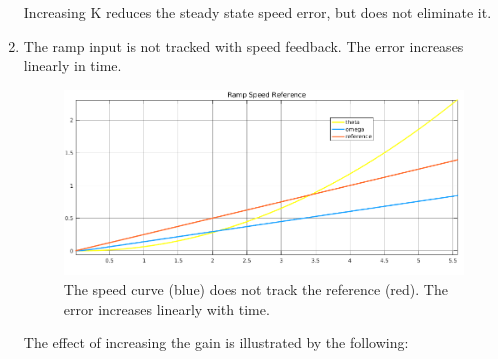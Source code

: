 \documentclass[11pt,a4paper]{article}
\begin{document}
\begin{enumerate}
Increasing K reduces the steady state speed error, but does not eliminate it.
	
	\item The ramp input is not tracked with speed feedback. The error increases linearly in time.
	
	\begin{figure}[!htbp]
	\includegraphics[width=\textwidth]{imglab/lab4sol_rampspeedtraj.png}
	\caption{The speed curve (blue) does not track the reference (red). The error increases linearly with time.}
	\end{figure}	
	
	The effect of increasing the gain is illustrated by the following:
	

\end{enumerate}
\end{document}
